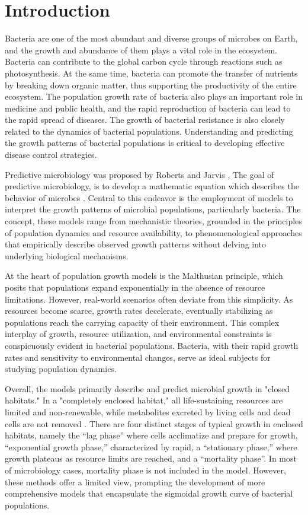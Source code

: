 \documentclass[11pt]{article}
\begin{document}
\section{Introduction}
Bacteria are one of the most abundant and diverse groups of microbes on Earth, and the growth and abundance of them plays a vital role in the ecosystem. Bacteria can contribute to the global carbon cycle through reactions such as photosynthesis. At the same time, bacteria can promote the transfer of nutrients by breaking down organic matter, thus supporting the productivity of the entire ecosystem\cite{keller2006}. The population growth rate of bacteria also plays an important role in medicine and public health, and the rapid reproduction of bacteria can lead to the rapid spread of diseases. The growth of bacterial resistance is also closely related to the dynamics of bacterial populations\cite{rivera-tapia2003}. Understanding and predicting the growth patterns of bacterial populations is critical to developing effective disease control strategies.

Predictive microbiology was proposed by Roberts and Jarvis
\cite{ross2003}, The goal of predictive microbiology, is to develop a mathematic equation which describes the behavior of microbes \cite{md2011}. Central to this endeavor is the employment of models to interpret the growth patterns of microbial populations, particularly bacteria. The concept, these models range from mechanistic theories, grounded in the principles of population dynamics and resource availability, to phenomenological approaches that empirically describe observed growth patterns without delving into underlying biological mechanisms. 


At the heart of population growth models is the Malthusian principle\cite{mcatee1936}, which posits that populations expand exponentially in the absence of resource limitations. However, real-world scenarios often deviate from this simplicity. As resources become scarce, growth rates decelerate, eventually stabilizing as populations reach the carrying capacity of their environment. This complex interplay of growth, resource utilization, and environmental constraints is conspicuously evident in bacterial populations. Bacteria, with their rapid growth rates and sensitivity to environmental changes, serve as ideal subjects for studying population dynamics.

Overall, the models primarily describe and predict microbial growth in "closed habitats." In a "completely enclosed habitat," all life-sustaining resources are limited and non-renewable, while metabolites excreted by living cells and dead cells are not removed \cite{peleg2011}. There are four distinct stages of typical growth in enclosed habitats, namely the “lag phase” where cells acclimatize and prepare for growth, “exponential growth phase,” characterized by rapid, a “stationary phase,” where growth plateaus as resource limits are reached, and a “mortality phase”\cite{peleg2011}. In most of microbiology cases, mortality phase is not included in the model. However, these methods offer a limited view, prompting the development of more comprehensive models that encapsulate the sigmoidal growth curve of bacterial populations.
\end{document}
